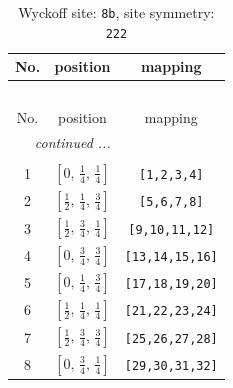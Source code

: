\documentclass[fleqn,8pt]{jsarticle}
\begin{document}
\begin{longtable}{ccc}
\caption{Wyckoff site: {\tt 8b}, site symmetry: {\tt 222}}
 \\
 \hline \hline
No. & position & mapping \\ \hline \endfirsthead

\multicolumn{2}{l}{\tablename\ \thetable{}} \\
 \hline \hline
No. & position & mapping \\ \hline \endhead

 \hline \hline
\multicolumn{2}{r}{\footnotesize\it continued ...} \\ \endfoot

 \hline \hline
\multicolumn{2}{r}{} \\ \endlastfoot

1 & $\left[ 0,\, \frac{1}{4},\, \frac{1}{4} \right]$ & {\tt [1,2,3,4]} \\ \hline
2 & $\left[ \frac{1}{2},\, \frac{1}{4},\, \frac{3}{4} \right]$ & {\tt [5,6,7,8]} \\ \hline
3 & $\left[ \frac{1}{2},\, \frac{3}{4},\, \frac{1}{4} \right]$ & {\tt [9,10,11,12]} \\ \hline
4 & $\left[ 0,\, \frac{3}{4},\, \frac{3}{4} \right]$ & {\tt [13,14,15,16]} \\ \hline
5 & $\left[ 0,\, \frac{1}{4},\, \frac{3}{4} \right]$ & {\tt [17,18,19,20]} \\ \hline
6 & $\left[ \frac{1}{2},\, \frac{1}{4},\, \frac{1}{4} \right]$ & {\tt [21,22,23,24]} \\ \hline
7 & $\left[ \frac{1}{2},\, \frac{3}{4},\, \frac{3}{4} \right]$ & {\tt [25,26,27,28]} \\ \hline
8 & $\left[ 0,\, \frac{3}{4},\, \frac{1}{4} \right]$ & {\tt [29,30,31,32]} \\
\end{longtable}
\renewcommand{\arraystretch}{1.2}
\end{document}
